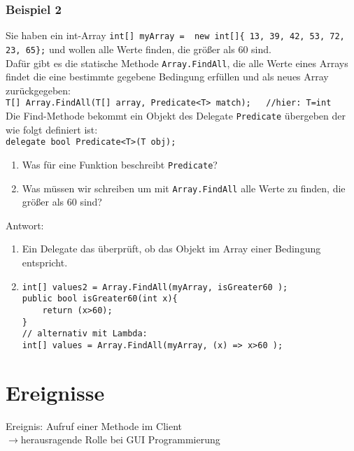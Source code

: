 \subsubsection*{Beispiel 2}
Sie haben ein int-Array \lstinline[language={[Sharp]C}]$int[] myArray =  new int[]{ 13, 39, 42, 53, 72, 23, 65};$ und wollen alle Werte finden, die größer als 60 sind.\\
Dafür gibt es die statische Methode \lstinline$Array.FindAll$, die alle Werte eines Arrays findet die eine bestimmte gegebene Bedingung erfüllen und als neues Array zurückgegeben:\\
\lstinline[language={[Sharp]C}]$T[] Array.FindAll(T[] array, Predicate<T> match);	//hier: T=int$\\
Die Find-Methode bekommt ein Objekt des Delegate \lstinline$Predicate$ übergeben der wie folgt definiert ist:\\
\lstinline[language={[Sharp]C}]$delegate bool Predicate<T>(T obj);$
\begin{enumerate}
\item Was für eine Funktion beschreibt \lstinline$Predicate$?
\item Was müssen wir schreiben um mit \lstinline$Array.FindAll$ alle Werte zu finden, die größer als 60 sind?
\end{enumerate}
Antwort:
\begin{enumerate}
\item Ein Delegate das überprüft, ob das Objekt im Array einer Bedingung entspricht.
\item \begin{lstlisting}[language={[Sharp]C}]
int[] values2 = Array.FindAll(myArray, isGreater60 );
public bool isGreater60(int x){
	return (x>60);
}
// alternativ mit Lambda:
int[] values = Array.FindAll(myArray, (x) => x>60 );
\end{lstlisting}
\end{enumerate}

\section{Ereignisse}

\begin{center}
\end{center}
Ereignis: Aufruf einer Methode im Client\\
$\to$herausragende Rolle bei GUI Programmierung

